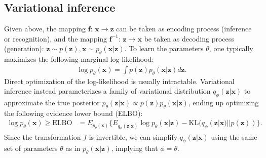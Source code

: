 \documentclass{article} %
\begin{document}
\subsection{Variational inference}
Given above, the mapping $\mathbf{f}$: $\mathbf{x} \xrightarrow{} \mathbf{z}$ can be taken as encoding process (inference or recognition), and the mapping $\mathbf{f}^{-1}$: $\mathbf{z} \xrightarrow{} \mathbf{x}$ be taken as decoding process (generation):
$\mathbf{z} \sim p(\mathbf{z}), \mathbf{x} \sim p_\theta(\mathbf{x}|\mathbf{z}).$
To learn the parameters $\theta$, one typically maximizes the following marginal log-likelihood:
\begin{align*}
    \log p_\theta(\mathbf{x}) = \int p(\mathbf{z})  p_\theta(\mathbf{x}|\mathbf{z})d\mathbf{z}.
\end{align*}
Direct optimization of the log-likelihood is usually intractable. Variational inference instead parameterizes a family of variational distribution $q_\phi(\mathbf{z}|\mathbf{x})$ to approximate the true posterior $p_\theta(\mathbf{z}|\mathbf{x}) \varpropto  p(\mathbf{z})  p_\theta(\mathbf{x}|\mathbf{z})$, ending up optimizing the following evidence lower bound (ELBO): 
\begin{align}\label{eq:vi_elbo}
    \log p_\theta(\mathbf{x}) \geqslant \text{ELBO} &= E_{p_\theta(\mathbf{x})} 
     \{E_{q_\phi(\mathbf{z}|\mathbf{x})} \log p_\theta(\mathbf{x}|\mathbf{z})  - \text{KL}(q_\phi(\mathbf{z}|\mathbf{x})||p(\mathbf{z}))\}.
\end{align}
Since the transformation $f$ is invertible, we can simplify $q_\phi(\mathbf{z}|\mathbf{x})$ using the same set of parameters $\theta$ as in $p_\theta(\mathbf{x}|\mathbf{z})$, implying that $\phi=\theta$.
\end{document}
